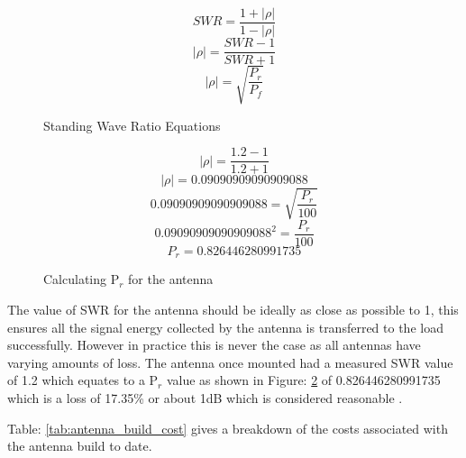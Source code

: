 \documentclass[runningheads,a4paper]{llncs}
\begin{document}
%
\begin{figure}[here]
  \centering
  \begin{equation}
  	SWR = \frac{1 + |\rho|}{1 - |\rho|} 
  \end{equation}
  \begin{equation}
  	|\rho| = \frac{SWR - 1}{SWR + 1} 
  \end{equation}
  \begin{equation}
  	|\rho| = \sqrt{\frac{P_r}{P_f}}
  \end{equation}
  \caption{Standing Wave Ratio Equations}
  \label{fig:swr_equation}
\end{figure}
%

%
\begin{figure}[here]
  \centering
  \begin{equation}
  	|\rho| = \frac{1.2 - 1}{1.2 + 1} 
  \end{equation}
  \begin{equation}
  	|\rho| = 0.09090909090909088
  \end{equation}
  \begin{equation}
  	0.09090909090909088 = \sqrt{\frac{P_r}{100}}
  \end{equation}
  \begin{equation}
  	0.09090909090909088^2 = \frac{P_r}{100}
  \end{equation}
  \begin{equation}
  	P_r = 0.826446280991735
  \end{equation}
  \caption{Calculating P$_{r}$ for the antenna}
  \label{fig:swr_equation_pr}
\end{figure}
%

The value of \gls{SWR} for the antenna should be ideally as close as possible to 1, this ensures all the signal energy collected by the antenna is transferred to the load successfully. However in practice this is never the case as all antennas have varying amounts of loss. The antenna once mounted had a measured \gls{SWR} value of 1.2 which equates to a P$_{r}$ value as shown in Figure: \ref{fig:swr_equation_pr} of 0.826446280991735 which is a loss of 17.35\% or about 1dB which is considered reasonable \citep{arrl-00}.

\newpage
Table: \ref{tab:antenna_build_cost} gives a breakdown of the costs associated with the antenna build to date.
\end{document}

